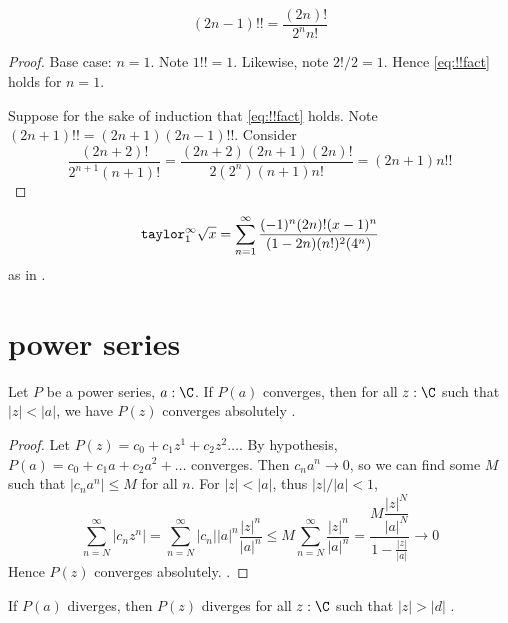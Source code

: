 \documentclass[10pt]{scrartcl}
\begin{document}

\begin{lemma}
  \begin{equation}
    (2n-1)!!=\frac{(2n)!}{2^nn!}\label{eq:!!fact}
  \end{equation}
\end{lemma}
\begin{proof}
  Base case: $n=1$. Note $1!!=1$. Likewise, note $2!/2=1$. Hence \cref{eq:!!fact} holds for $n=1$. 

  Suppose for the sake of induction that \cref{eq:!!fact} holds. Note
  $(2n+1)!!=(2n+1)(2n-1)!!$. Consider 
  \[
  \frac{(2n+2)!}{2^{n+1}(n+1)!}=\frac{(2n+2)(2n+1)(2n)!}{2(2^n)(n+1)n!}=(2n+1)n!!
  \]
\end{proof}
\begin{cor}
  \[
  \mathtt{taylor}_1^\infty\sqrt x= \sum_{n=1}^\infty\frac{(-1)^n(2n)!(x-1)^n}{(1-2n)(n!)^2(4^n)}
  \]
  as in \cite{wiki:sqrt}.
\end{cor}
\section{power series}
\begin{theorem}
  Let $P$ be a power series, $a:\C$. If $P(a)$ converges, then for all $z:\C$ such that $|z|<|a|$, we have $P(z)$ converges absolutely \cite{needham:visual-complex}.
\end{theorem}
\begin{proof}
  Let $P(z)=c_0+c_1z^1+c_2z^2\dots$. By hypothesis, $P(a)=c_0+c_1a+c_2a^2+\dots$ converges. Then $c_na^n\to 0$, so we can find some $M$ such that $|c_na^n|\leq M$ for all $n$. For $|z|<|a|$, thus $|z|/|a|<1$, 
  \[
  \sum_{n=N}^\infty |c_n z^n|=\sum_{n=N}^\infty |c_n||a|^n \frac{|z|^n}{|a|^n} \leq M\sum_{n=N}^\infty \frac{|z|^n}{|a|^n} =\dfrac{M\dfrac{|z|^N}{|a|^N}}{1-\frac{|z|}{|a|}}\to 0
  \]
  Hence $P(z)$ converges absolutely.
  \cite{needham:visual-complex}. 
\end{proof}
\begin{cor}
  If $P(a)$ diverges, then $P(z)$ diverges for all $z:\C$ such that $|z|>|d|$
\cite{needham:visual-complex}. 
\end{cor}
\end{document}
